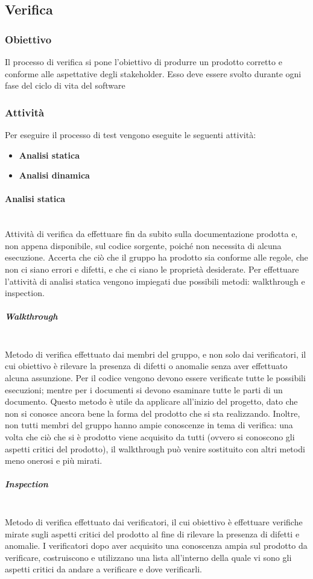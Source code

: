 \subsection{Verifica}
\subsubsection{Obiettivo}
Il processo di verifica si pone l’obiettivo di produrre un prodotto corretto e conforme alle aspettative degli stakeholder.
Esso deve essere svolto durante ogni fase del ciclo di vita del software

\subsubsection{Attività}
Per eseguire il processo di test vengono eseguite le seguenti attività:
\begin{itemize} 
\item \textbf{Analisi statica}
\item \textbf{Analisi dinamica}
\end{itemize}

\paragraph{Analisi statica} \mbox{}\\
Attività di verifica da effettuare fin da subito sulla documentazione prodotta e, non appena disponibile, sul codice sorgente, poiché non necessita di alcuna esecuzione.
Accerta che ciò che il gruppo ha prodotto sia conforme alle regole, che non ci siano errori e difetti, e che ci siano le proprietà desiderate.
Per effettuare l’attività di analisi statica vengono impiegati due possibili metodi: walkthrough e inspection.
\setlength{\parindent}{-0.1em}
\subparagraph*{Walkthrough} \mbox{}\\ %
Metodo di verifica effettuato dai membri del gruppo, e non solo dai verificatori, il cui obiettivo è rilevare la presenza di difetti o anomalie senza aver effettuato alcuna assunzione.
Per il codice vengono devono essere verificate tutte le possibili esecuzioni; mentre per i documenti si devono esaminare tutte le parti di un documento.
Questo metodo è utile da applicare all’inizio del progetto, dato che non si conosce ancora bene la forma del prodotto che si sta realizzando.
Inoltre, non tutti membri del gruppo hanno ampie conoscenze in tema di verifica: una volta che ciò che si è prodotto viene acquisito da tutti (ovvero si conoscono gli aspetti critici del prodotto), il walkthrough può venire sostituito con altri metodi meno onerosi e più mirati.
\subparagraph*{Inspection} \mbox{}\\
Metodo di verifica effettuato dai verificatori, il cui obiettivo è effettuare verifiche mirate sugli aspetti critici del prodotto al fine di rilevare la presenza di difetti e anomalie.
I verificatori dopo aver acquisito una conoscenza ampia sul prodotto da verificare, costruiscono e utilizzano una lista all’interno della quale vi sono gli aspetti critici da andare a verificare e dove verificarli.

